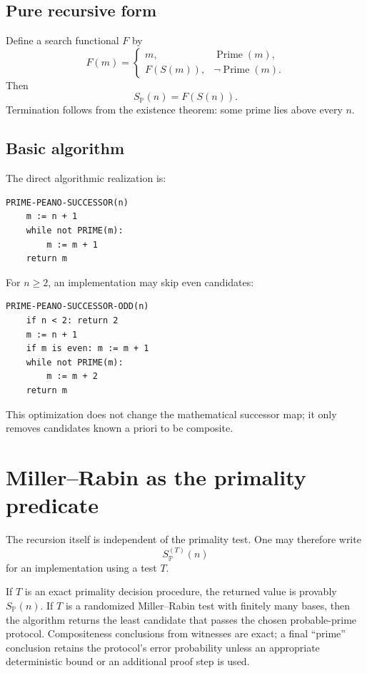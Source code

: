 \documentclass[11pt]{article}
\theoremstyle{definition}
\newcommand{\Pp}{\mathbb{P}}
\newcommand{\SP}{S_{\!\Pp}}
\newcommand{\Prime}{\operatorname{Prime}}
\begin{document}
\subsection{Pure recursive form}

Define a search functional $F$ by
\[
F(m)=
\begin{cases}
m,&\Prime(m),\\
F(S(m)),&\neg\Prime(m).
\end{cases}
\]
Then
\[
\boxed{\SP(n)=F(S(n)).}
\]
Termination follows from the existence theorem: some prime lies above every $n$.

\subsection{Basic algorithm}

The direct algorithmic realization is:

\begin{lstlisting}[language={},basicstyle=\ttfamily\small,frame=single]
PRIME-PEANO-SUCCESSOR(n)
    m := n + 1
    while not PRIME(m):
        m := m + 1
    return m
\end{lstlisting}

For $n\ge2$, an implementation may skip even candidates:

\begin{lstlisting}[language={},basicstyle=\ttfamily\small,frame=single]
PRIME-PEANO-SUCCESSOR-ODD(n)
    if n < 2: return 2
    m := n + 1
    if m is even: m := m + 1
    while not PRIME(m):
        m := m + 2
    return m
\end{lstlisting}

This optimization does not change the mathematical successor map; it only removes candidates known a priori to be composite.

\section{Miller--Rabin as the primality predicate}

The recursion itself is independent of the primality test. One may therefore write
\[
\SP^{(T)}(n)
\]
for an implementation using a test $T$.

If $T$ is an exact primality decision procedure, the returned value is provably $\SP(n)$. If $T$ is a randomized Miller--Rabin test with finitely many bases, then the algorithm returns the least candidate that passes the chosen probable-prime protocol. Compositeness conclusions from witnesses are exact; a final ``prime'' conclusion retains the protocol's error probability unless an appropriate deterministic bound or an additional proof step is used.
\end{document}
